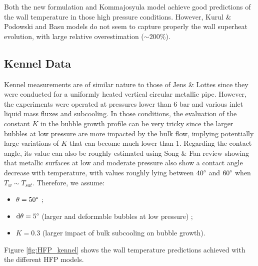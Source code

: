 \npar

Both the new formulation and Kommajosyula model achieve good predictions of the wall temperature in those high pressure conditions. However, Kurul \& Podowski and Basu models do not seem to capture properly the wall superheat evolution, with large relative overestimation ($\sim 200\%$).


\clearpage


\subsection{Kennel Data}
\label{subsec:HFP_verif_kennel}

Kennel measurements are of similar nature to those of Jens \& Lottes since they were conducted for a uniformly heated vertical circular metallic pipe. However, the experiments were operated at pressures lower than 6 bar and various inlet liquid mass fluxes and subcooling. In those conditions, the evaluation of the constant $K$ in the bubble growth profile can be very tricky since the larger bubbles at low pressure are more impacted by the bulk flow, implying potentially large variations of $K$ that can become much lower than 1. Regarding the contact angle, its value can also be roughly estimated using Song \& Fan review \cite{song_temperature_2021} showing that metallic surfaces at low and moderate pressure also show a contact angle decrease with temperature, with values roughly lying between $40 \degree$ and $60 \degree$ when $T_{w} \sim T_{sat}$. Therefore, we assume:


\begin{itemize}
\item $\theta = 50 \degree$ ;
\item $\mathrm{d}\theta = 5 \degree$ (larger and deformable bubbles at low pressure) ;
\item $K = 0.3$ (larger impact of bulk subcooling on bubble growth).
\end{itemize}



\npar



Figure \ref{fig:HFP_kennel} shows the wall temperature predictions achieved with the different HFP models.

